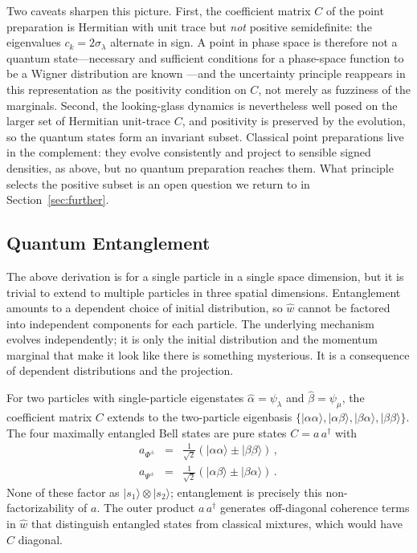 \documentclass[12pt]{article}
\begin{document}
Two caveats sharpen this picture.  First, the coefficient matrix $C$ of the point preparation is Hermitian with unit trace but \emph{not} positive semidefinite: the eigenvalues $c_k = 2\sigma_\lambda$ alternate in sign.  A point in phase space is therefore not a quantum state---necessary and sufficient conditions for a phase-space function to be a Wigner distribution are known \cite{narcowich1986}---and the uncertainty principle reappears in this representation as the positivity condition on $C$, not merely as fuzziness of the marginals.  Second, the looking-glass dynamics is nevertheless well posed on the larger set of Hermitian unit-trace $C$, and positivity is preserved by the evolution, so the quantum states form an invariant subset.  Classical point preparations live in the complement: they evolve consistently and project to sensible signed densities, as above, but no quantum preparation reaches them.  What principle selects the positive subset is an open question we return to in Section~\ref{sec:further}.

\subsection{Quantum Entanglement}
The above derivation is for a single particle in a single space dimension, but it is trivial to extend to multiple particles in three spatial dimensions.  Entanglement amounts to a dependent choice of initial distribution, so $\hat{w}$ cannot be factored into independent components for each particle. The underlying mechanism evolves independently; it is only the initial distribution and the momentum marginal that make it look like there is something mysterious.  It is a consequence of dependent distributions and the projection.

For two particles with single-particle eigenstates $\hat{\alpha}=\psi_{\lambda}$ and $\hat{\beta}=\psi_\mu$, the coefficient matrix $C$ extends to the two-particle eigenbasis $\{|\alpha\alpha\rangle, |\alpha\beta\rangle, |\beta\alpha\rangle, |\beta\beta\rangle\}$.  The four maximally entangled Bell states are pure states $C = a\,a^\dagger$ with
\begin{eqnarray}
a_{\Phi^{\pm}} &=& \tfrac{1}{\sqrt{2}}(|\alpha\alpha\rangle \pm |\beta\beta\rangle) \,,\\
a_{\Psi^{\pm}} &=& \tfrac{1}{\sqrt{2}}(|\alpha\beta\rangle \pm |\beta\alpha\rangle) \,.
\end{eqnarray}
None of these factor as $|s_1\rangle \otimes |s_2\rangle$; entanglement is precisely this non-factorizability of $a$.  The outer product $a\,a^\dagger$ generates off-diagonal coherence terms in $\hat{w}$ that distinguish entangled states from classical mixtures, which would have $C$ diagonal.
\end{document}
